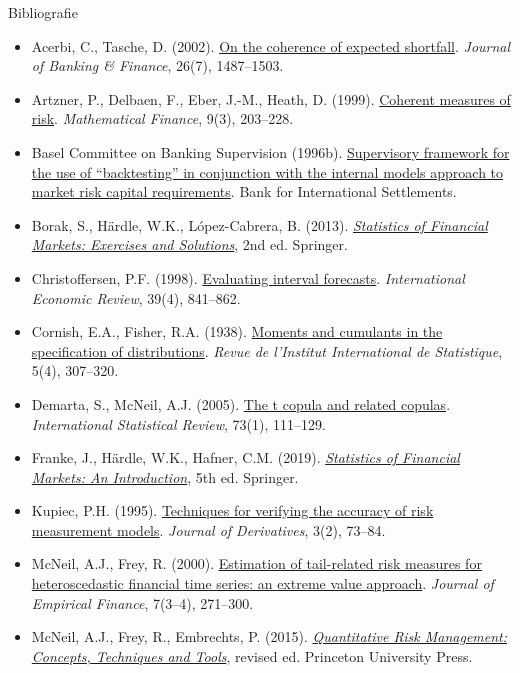 \begin{frame}{Bibliografie}
\itemsize{\tiny}
\begin{itemize}
    \item Acerbi, C., Tasche, D. (2002). \href{https://doi.org/10.1016/S0378-4266(02)00283-2}{On the coherence of expected shortfall}. \textit{Journal of Banking \& Finance}, 26(7), 1487--1503.
    \item Artzner, P., Delbaen, F., Eber, J.-M., Heath, D. (1999). \href{https://doi.org/10.1111/1467-9965.00068}{Coherent measures of risk}. \textit{Mathematical Finance}, 9(3), 203--228.
    \item Basel Committee on Banking Supervision (1996b). \href{https://www.bis.org/publ/bcbs22.htm}{Supervisory framework for the use of ``backtesting'' in conjunction with the internal models approach to market risk capital requirements}. Bank for International Settlements.
    \item Borak, S., Härdle, W.K., López-Cabrera, B. (2013). \href{https://doi.org/10.1007/978-3-642-33929-5}{\textit{Statistics of Financial Markets: Exercises and Solutions}}, 2nd ed. Springer.
    \item Christoffersen, P.F. (1998). \href{https://doi.org/10.2307/2527341}{Evaluating interval forecasts}. \textit{International Economic Review}, 39(4), 841--862.
    \item Cornish, E.A., Fisher, R.A. (1938). \href{https://doi.org/10.2307/1400905}{Moments and cumulants in the specification of distributions}. \textit{Revue de l'Institut International de Statistique}, 5(4), 307--320.
    \item Demarta, S., McNeil, A.J. (2005). \href{https://doi.org/10.1111/j.1751-5823.2005.tb00254.x}{The t copula and related copulas}. \textit{International Statistical Review}, 73(1), 111--129.
    \item Franke, J., Härdle, W.K., Hafner, C.M. (2019). \href{https://doi.org/10.1007/978-3-030-13751-9}{\textit{Statistics of Financial Markets: An Introduction}}, 5th ed. Springer.
    \item Kupiec, P.H. (1995). \href{https://doi.org/10.3905/jod.1995.407942}{Techniques for verifying the accuracy of risk measurement models}. \textit{Journal of Derivatives}, 3(2), 73--84.
    \item McNeil, A.J., Frey, R. (2000). \href{https://doi.org/10.1016/S0927-5398(00)00012-8}{Estimation of tail-related risk measures for heteroscedastic financial time series: an extreme value approach}. \textit{Journal of Empirical Finance}, 7(3--4), 271--300.
    \item McNeil, A.J., Frey, R., Embrechts, P. (2015). \href{https://press.princeton.edu/books/hardcover/9780691166278/quantitative-risk-management}{\textit{Quantitative Risk Management: Concepts, Techniques and Tools}}, revised ed. Princeton University Press.
\end{itemize}
\end{frame}


